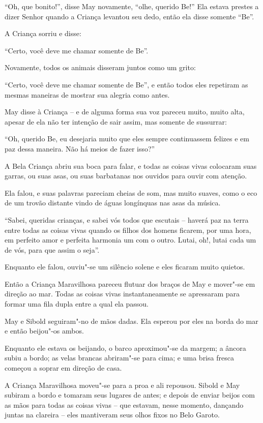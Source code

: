 ``Oh, que bonito!'', disse May novamente, ``olhe, querido Be!'' Ela
estava prestes a dizer Senhor quando a Criança levantou seu dedo, então
ela disse somente ``Be''.

A Criança sorriu e disse:

``Certo, você deve me chamar somente de Be''.

Novamente, todos os animais disseram juntos como um grito:

``Certo, você deve me chamar somente de Be'', e então todos eles
repetiram as mesmas maneiras de mostrar sua alegria como antes.

May disse à Criança -- e de alguma forma sua voz pareceu muito, muito
alta, apesar de ela não ter intenção de sair assim, mas somente de
sussurrar:

``Oh, querido Be, eu desejaria muito que eles sempre continuassem
felizes e em paz dessa maneira. Não há meios de fazer isso?''

A Bela Criança abriu sua boca para falar, e todas as coisas vivas
colocaram suas garras, ou suas asas, ou suas barbatanas nos ouvidos para
ouvir com atenção.

Ela falou, e suas palavras pareciam cheias de som, mas muito suaves,
como o eco de um trovão distante vindo de águas longínquas nas asas da
música.

``Sabei, queridas crianças, e sabei vós todos que escutais -- haverá paz
na terra entre todas as coisas vivas quando os filhos dos homens
ficarem, por uma hora, em perfeito amor e perfeita harmonia um com o
outro. Lutai, oh!, lutai cada um de vós, para que assim o seja''.

Enquanto ele falou, ouviu"-se um silêncio solene e eles ficaram muito
quietos.

Então a Criança Maravilhosa pareceu flutuar dos braços de May e mover"-se
em direção ao mar. Todas as coisas vivas instantaneamente se apressaram
para formar uma fila dupla entre a qual ela passou.

May e Sibold seguiram"-no de mãos dadas. Ela esperou por eles na borda do
mar e então beijou"-os ambos.

Enquanto ele estava os beijando, o barco aproximou"-se da margem; a
âncora subiu a bordo; as velas brancas abriram"-se para cima; e uma brisa
fresca começou a soprar em direção de casa.

A Criança Maravilhosa moveu"-se para a proa e ali repousou. Sibold e May
subiram a bordo e tomaram seus lugares de antes; e depois de enviar
beijos com as mãos para todas as coisas vivas -- que estavam, nesse
momento, dançando juntas na clareira -- eles mantiveram seus olhos fixos
no Belo Garoto.

